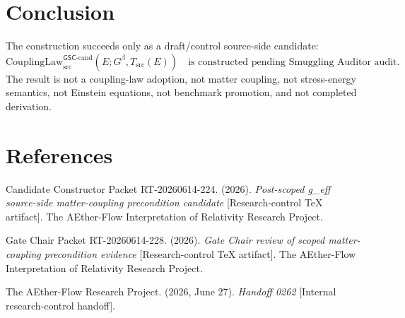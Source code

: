 \documentclass[11pt]{article}
\newcommand{\Gbeta}{G^\beta}
\newcommand{\CouplingLaw}{\mathrm{CouplingLaw}^{\mathsf{GSC}\mbox{-}\mathrm{cand}}_{\mathrm{src}}}
\begin{document}
\section{Conclusion}

The construction succeeds only as a draft/control source-side candidate:
\[
  \CouplingLaw(E;\Gbeta,T_{\mathrm{src}}(E))
  \quad\text{is constructed pending Smuggling Auditor audit.}
\]
The result is not a coupling-law adoption, not matter coupling, not
stress-energy semantics, not Einstein equations, not benchmark promotion, and
not completed derivation.

\section{References}

Candidate Constructor Packet RT-20260614-224. (2026). \textit{Post-scoped
g\_eff source-side matter-coupling precondition candidate}
[Research-control TeX artifact]. The AEther-Flow Interpretation of Relativity
Research Project.

Gate Chair Packet RT-20260614-228. (2026). \textit{Gate Chair review of
scoped matter-coupling precondition evidence} [Research-control TeX artifact].
The AEther-Flow Interpretation of Relativity Research Project.

The AEther-Flow Research Project. (2026, June 27). \textit{Handoff 0262}
[Internal research-control handoff].
\end{document}
